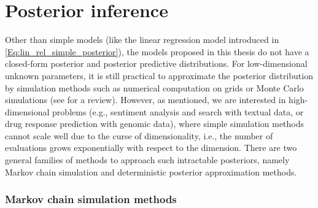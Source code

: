 \documentclass[dissertation,math,vertlayout,pdfa,colorlinks]{aaltoseries}
\begin{document}
\section{Posterior inference} \label{posteriro_inf}
Other than simple models (like the linear regression model introduced in \ref{Eq:lin_rel_simple_posterior}), the models proposed in this thesis do not have a closed-form posterior and posterior predictive distributions. For low-dimensional unknown parameters, it is still practical to approximate the posterior distribution by simulation methods such as numerical computation on grids or Monte Carlo simulations (see \cite[Chapter~10]{Gelman2013} for a review). However, as mentioned, we are interested in high-dimensional problems (e.g., sentiment analysis and search with textual data, or drug response prediction with genomic data), where simple simulation methods cannot scale well due to the curse of dimensionality, i.e., the number of evaluations grows exponentially with respect to the dimension. There are two general families of methods to approach such intractable posteriors, namely Markov chain simulation and deterministic posterior approximation methods.

\subsubsection{Markov chain simulation methods}
\end{document}
